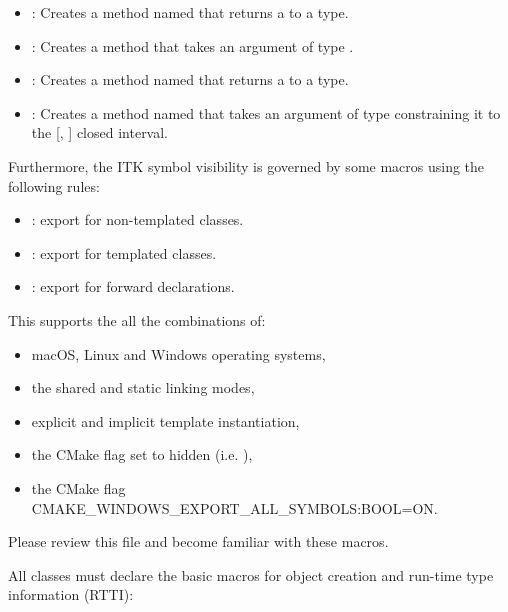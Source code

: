 \begin{itemize}
that takes argument type . For ITK objects,
 must be used in lieu of .
\item {}: Creates a method named
 that returns a  to a  type.
\item {}: Creates a method
 that takes an argument of type .
\item {}: Creates a method named
 that returns a   to a
 type.
\item {}: Creates a method named
 that takes an argument of type  constraining it
to the [, ] closed interval.
\end{itemize}

Furthermore, the ITK symbol visibility is governed by some macros using the
following rules:
\begin{itemize}
\item {}: export for non-templated classes.
\item {}: export for templated classes.
\item {}: export for forward declarations.
\end{itemize}

This supports the all the combinations of:
\begin{itemize}
\item macOS, Linux and Windows operating systems,
\item the shared   and  static
linking modes,
\item explicit and implicit template instantiation,
\item the CMake  flag set to hidden (i.e.
),
\item the CMake flag {CMAKE\_WINDOWS\_EXPORT\_ALL\_SYMBOLS:BOOL=ON}.
\end{itemize}

Please review this file and become familiar with these macros.

All classes must declare the basic macros for object creation and run-time type
information (RTTI):

